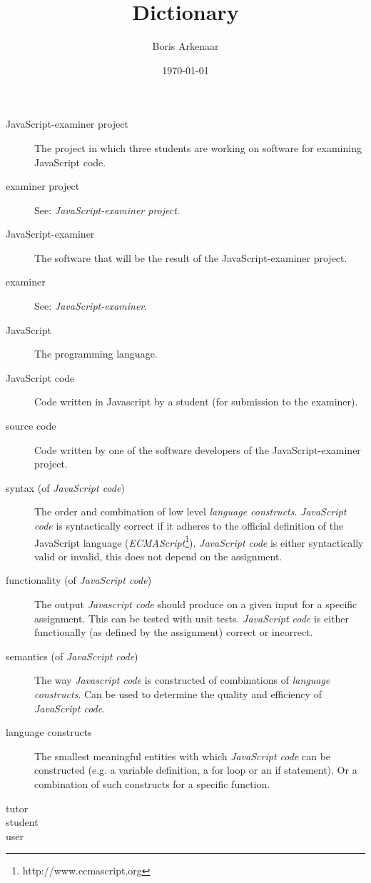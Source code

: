 \documentclass{article}
\begin{document}
\title{Dictionary}
\author{Boris Arkenaar}
\date{\today}
\maketitle

\begin{description}
  \item[JavaScript-examiner project] The project in which three students are
    working on software for examining JavaScript code.
  \item[examiner project] See: {\em JavaScript-examiner project}.
  \item[JavaScript-examiner] The software that will be the result of the
    JavaScript-examiner project.
  \item[examiner] See: {\em JavaScript-examiner}.
  \item[JavaScript] The programming language.
  \item[JavaScript code] Code written in Javascript by a student (for
    submission to the examiner).
  \item[source code] Code written by one of the software developers of the
    JavaScript-examiner project.
  \item[syntax (of {\em JavaScript code})] The order and combination of low
    level {\em language constructs}. {\em JavaScript code} is syntactically
    correct if it adheres to the official definition of the JavaScript language
    ({\em ECMAScript}\footnote{http://www.ecmascript.org}). {\em JavaScript
    code} is either syntactically valid or invalid, this does not depend on the
    assignment.
  \item[functionality (of {\em JavaScript code})] The output {\em Javascript
    code} should produce on a given input for a specific assignment. This can
    be tested with unit tests. {\em JavaScript code} is either functionally (as
    defined by the assignment) correct or incorrect.
  \item[semantics (of {\em JavaScript code})] The way {\em Javascript code} is
    constructed of combinations of {\em language constructs}. Can be used to
    determine the quality and efficiency of {\em JavaScript code}.
  \item[language constructs] The smallest meaningful entities with which {\em
    JavaScript code} can be constructed (e.g. a variable definition, a for loop
    or an if statement). Or a combination of such constructs for a specific
    function.
  \item[tutor] 
  \item[student]
  \item[user]

\end{description}
\end{document}
